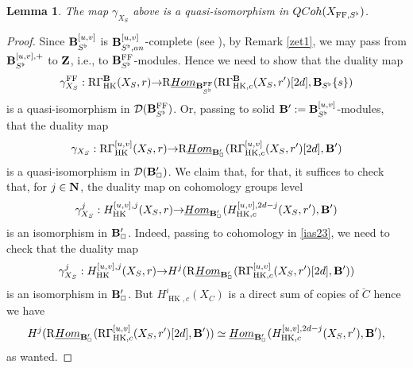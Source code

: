 \documentclass[10pt,reqno]{amsart}
\newtheorem{lemma}[equation]{Lemma}
\theoremstyle{definition}
\theoremstyle{remark}
\newcommand{\uHom}{\underline{{\rm{Hom}} }}
\newcommand{\hk}{\operatorname{HK} }
\newcommand{\FF}{\operatorname{FF} }
\newcommand{\sd}{{\mathcal{D}}}
\numberwithin{equation}{section}
\def\R{{\mathrm R}}
\def\N{{\bf N}}
\numberwithin{equation}{section}
\begin{document}
 \begin{lemma}\label{kolobrzeg4a}
The map $ \gamma_{X_S}$ above is a quasi-isomorphism in ${\rm QCoh}(X_{\FF,S^{\flat}})$. 
\end{lemma}
\begin{proof} Since ${\bf B}_{S^{\flat}}^{[u,v]}$ is $\B^{[u,v]}_{S^{\flat},{\rm an}}$-complete (see \cite[Lemma 3.24]{And21}), by Remark \ref{zet1}, 
we may pass from ${\bf B}^{[u,v],+}_{S^{\flat}}$ to ${\bf Z}$, i.e.,  to $\B^{\FF}_{S^{\flat}}$-modules.  Hence we need to show that the duality map
$$
\gamma^{\FF}_{X_S}: \R\Gamma^{\B}_{\hk}(X_S,r){\to} \R\uHom_{\B^{\FF}_{S^{\flat}}}(\R\Gamma^{\B}_{\hk,c}(X_S,r^{\prime})[2d],\B_{S^{\flat}}\{s\})
$$
is a quasi-isomorphism in $\sd(\B^{\FF}_{S^{\flat}})$. Or, passing to solid 
${\bf B}^{\prime}:={\bf B}_{S^{\flat}}^{[u,v]}$-modules, that the duality map
\begin{equation}\label{ias23}
\gamma_{X_S}:  \R\Gamma^{{[u,v]}}_{\hk}(X_S,r){\to} \R\uHom_{\B^{\prime}_{\Box}}(\R\Gamma^{{[u,v]}}_{\hk,c}(X_S,r^{\prime})[2d],\B^{\prime})
\end{equation}
is a quasi-isomorphism in $\sd(\B^{\prime}_{\Box})$. We claim that, for that,
 it suffices to check that, for $j\in\N$, the duality map on cohomology groups level
\begin{equation}\label{ias231}
\gamma^j_{X_S}: H^{{[u,v]},j}_{\hk}(X_S,r){\to} \uHom_{\B^{\prime}_{\Box}}(H^{{[u,v]},2d-j}_{\hk,c}(X_S,r^{\prime}),\B^{\prime})
\end{equation}
is an isomorphism in ${\bf B}^{\prime}_{\Box}$. 
Indeed, passing to cohomology in \eqref{ias23}, we need to check that the duality map
$$
\gamma^j_{X_S}: H^{{[u,v]},j}_{\hk}(X_S,r){\to} H^j(\R\uHom_{\B^{\prime}_{\Box}}(\R\Gamma^{{[u,v]}}_{\hk,c}(X_S,r^{\prime})[2d],\B^{\prime}))
$$
is an isomorphism in ${\bf B}^{\prime}_{\Box}$. But  $H^i_{\hk,c}(X_C)$ is a direct sum of copies of $\breve{C}$  hence we have 
$$
H^j(\R\uHom_{\B^{\prime}_{\Box}}(\R\Gamma^{{[u,v]}}_{\hk,c}(X_S,r^{\prime})[2d],\B^{\prime}))\simeq \uHom_{\B^{\prime}_{\Box}}(H^{{[u,v]},2d-j}_{\hk,c}(X_S,r^{\prime}),\B^{\prime}),
$$
as wanted.




\end{proof}
\end{document}
